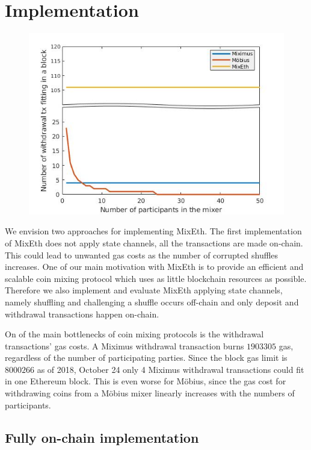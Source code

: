 \documentclass[a4paper]{article}
\theoremstyle{definition}
\begin{document}
\newpage
\section{Implementation}

\begin{figure}
	\centering
	\includegraphics[scale=0.7]{./withdrawalComplexity.jpg}
\end{figure}

We envision two approaches for implementing MixEth. The first implementation of MixEth does not apply state channels, all the transactions are made on-chain. This could lead to unwanted gas costs as the number of corrupted shuffles increases. One of our main motivation with MixEth is to provide an efficient and scalable coin mixing protocol which uses as little blockchain resources as possible. Therefore we also implement and evaluate MixEth applying state channels, namely shuffling and challenging a shuffle occurs off-chain and only deposit and withdrawal transactions happen on-chain. 

On of the main bottlenecks of coin mixing protocols is the withdrawal transactions' gas costs. A Miximus withdrawal transaction burns $\num[group-separator={,}]{1903305}$ gas, regardless of the number of participating parties. Since the block gas limit is $\num[group-separator={,}]{8000266}$ as of 2018, October 24 only 4 Miximus withdrawal transactions could fit in one Ethereum block. This is even worse for Möbius, since the gas cost for withdrawing coins from a Möbius mixer linearly increases with the numbers of participants.    

\subsection{Fully on-chain implementation}
\end{document}
